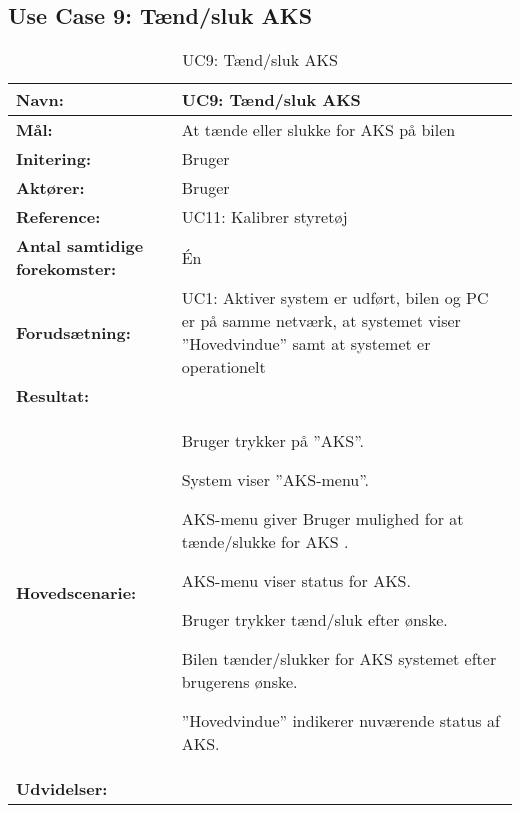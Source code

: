 \subsection{Use Case 9: Tænd/sluk AKS}
\begin{table}[h]
\begin{tabularx}{\textwidth}{| L{3.3 cm} | Z |} 																			   \hline

\textbf{Navn:} 						& UC9: Tænd/sluk AKS 																	\\ \hline
\textbf{Mål:}						& At tænde eller slukke for AKS på bilen 												\\ \hline
\textbf{Initering:}					& Bruger 																				\\ \hline
\textbf{Aktører:} 					& Bruger 																				\\ \hline  
\textbf{Reference:} 				& UC11: Kalibrer styretøj																\\ \hline
\textbf{Antal samtidige forekomster:} & Én 																					\\ \hline
\textbf{Forudsætning:} 				& UC1: Aktiver system er udført, bilen og PC er på samme netværk, 
									   at systemet viser ''Hovedvindue'' samt at systemet er operationelt					\\ \hline
\textbf{Resultat:}					&  																						\\ \hline
\textbf{Hovedscenarie:}				& 

\begin{packed_enum}
\item Bruger trykker på ''AKS''.
\item System viser ''AKS-menu''.
\item AKS-menu giver Bruger mulighed for at tænde/slukke for AKS .
\item AKS-menu viser status for AKS.
\item Bruger trykker tænd/sluk efter ønske.
\item Bilen tænder/slukker for AKS systemet efter brugerens ønske.
\item ''Hovedvindue'' indikerer nuværende status af AKS.
\end{packed_enum} 																											\\ \hline
\textbf{Udvidelser:}				&  
~
																															\\ \hline
\end{tabularx}
\caption{UC9: Tænd/sluk AKS}
\label{tbl:UC9}
\end{table}